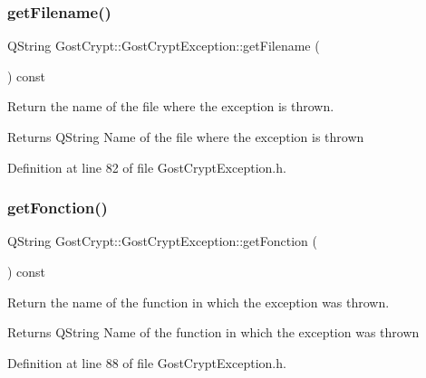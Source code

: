 \subsubsection{\texorpdfstring{get\+Filename()}{getFilename()}}
{\footnotesize\ttfamily Q\+String Gost\+Crypt\+::\+Gost\+Crypt\+Exception\+::get\+Filename (\begin{DoxyParamCaption}{ }\end{DoxyParamCaption}) const\hspace{0.3cm}{\ttfamily [inline]}}



Return the name of the file where the exception is thrown. 

\begin{DoxyReturn}{Returns}
Q\+String Name of the file where the exception is thrown 
\end{DoxyReturn}


Definition at line 82 of file Gost\+Crypt\+Exception.\+h.

\mbox{\label{class_gost_crypt_1_1_gost_crypt_exception_adbb5f1323bb55fc9475a5b7da7ccf2d7}} 
\subsubsection{\texorpdfstring{get\+Fonction()}{getFonction()}}
{\footnotesize\ttfamily Q\+String Gost\+Crypt\+::\+Gost\+Crypt\+Exception\+::get\+Fonction (\begin{DoxyParamCaption}{ }\end{DoxyParamCaption}) const\hspace{0.3cm}{\ttfamily [inline]}}



Return the name of the function in which the exception was thrown. 

\begin{DoxyReturn}{Returns}
Q\+String Name of the function in which the exception was thrown 
\end{DoxyReturn}


Definition at line 88 of file Gost\+Crypt\+Exception.\+h.

\mbox{\label{class_gost_crypt_1_1_gost_crypt_exception_a95bde6d8320f0337b1696309502ec40d}} 
